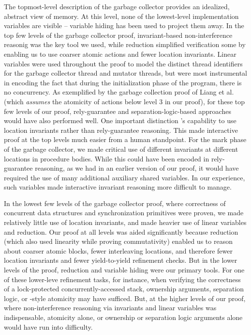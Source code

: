 The topmost-level description of the garbage collector provides an
idealized, abstract view of memory. 
At this level, none of the lowest-level implementation variables are
visible -- variable hiding has been used to project them away. 
In the top few levels of the garbage collector proof, invariant-based
non-interference reasonig was the key tool we used, while reduction
simplified verification some by enabling us to use coarser atomic actions and fewer
location invariants.  
Linear variables were used throughout the proof to model the distinct
thread identifiers for the garbage collector thread and mutator
threads, but were most instrumental in encoding the fact that during
the initialization phase of the program, there is no concurrency.
As exemplified by the
garbage collection proof of Liang et al.~\cite{LiangRGSim} (which
{\em assumes} the atomicity of actions below level 3 in our proof),
for these top few levels of our proof, rely-guarantee and separation-logic-based
approaches would have also performed well. 
One important distinction \civl's capability
to use location invariants rather than rely-guarantee reasoning.
This made interactive proof at the top levels much easier from a human standpoint. 
For the mark phase of the garbage collector, we made critical use of different invariants at different
locations in procedure bodies. 
While this could have been encoded in
rely-guarantee reasoning, as we had in
an earlier version of our proof, it would have required the use of
many additional auxiliary shared variables. 
In our experience, such variables made interactive invariant reasoning
more difficult to manage. 

In the lowest few levels of the garbage collector proof, where
correctness of concurrent data structures and synchronization primitives were proven, we made
relatively little use of location invariants, and made heavier use of
linear variables and reduction.
Our proof at all levels was aided significantly because
reduction (which also used linearity while proving commutativity)
enabled us to reason about coarser atomic blocks, fewer interleaving
locations, and therefore fewer location invariants and fewer 
yield-to-yield refinement checks. 
But in the lower levels of the proof, reduction and variable hiding were our primary
tools. 
For one of these lower-leve refinement tasks, for instance, when verifying the correctness of a
lock-protected concurrently-accessed stack, ownership
arguments, separation logic, or \QED-style atomicity may have
sufficed. 
But, at the higher levels of our proof, where non-interference
reasoning via invariants and linear variables was indispensable, 
atomicity alone, or ownership or separation logic arguments alone
would have run into difficulty. 

